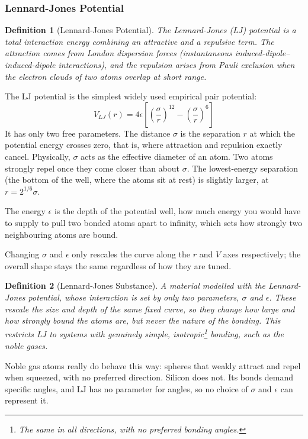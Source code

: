 \documentclass{article}
\newtheorem{definition}{Definition}
\begin{document}
\subsubsection{Lennard-Jones Potential}
\begin{definition}[Lennard-Jones Potential]
    The Lennard-Jones (LJ) potential is a total interaction energy combining an attractive and a repulsive term. The attraction comes from London dispersion forces (instantaneous induced-dipole--induced-dipole interactions), and the repulsion arises from Pauli exclusion when the electron clouds of two atoms overlap at short range.
\end{definition}
The LJ potential is the simplest widely used empirical pair potential:
\begin{equation}
    V_{LJ}(r) = 4\epsilon \left[ \left( \frac{\sigma}{r} \right)^{12} - \left( \frac{\sigma}{r} \right)^{6} \right]
\end{equation}
It has only two free parameters. The distance $\sigma$ is the separation $r$ at which the potential energy crosses zero, that is, where attraction and repulsion exactly cancel. Physically, $\sigma$ acts as the effective diameter of an atom. Two atoms strongly repel once they come closer than about $\sigma$. The lowest-energy separation (the bottom of the well, where the atoms sit at rest) is slightly larger, at $r = 2^{1/6}\sigma$.

The energy $\epsilon$ is the depth of the potential well, how much energy you would have to supply to pull two bonded atoms apart to infinity, which sets how strongly two neighbouring atoms are bound.

Changing $\sigma$ and $\epsilon$ only rescales the curve along the $r$ and $V$ axes respectively; the overall shape stays the same regardless of how they are tuned.
\begin{definition}[Lennard-Jones Substance]
    \label{LJ Substance}
    A material modelled with the Lennard-Jones potential, whose interaction is set by only two parameters, $\sigma$ and $\epsilon$. These rescale the size and depth of the same fixed curve, so they change how large and how strongly bound the atoms are, but never the nature of the bonding. This restricts LJ to systems with genuinely simple, isotropic\footnote{The same in all directions, with no preferred bonding angles.} bonding, such as the noble gases.
\end{definition}
Noble gas atoms really do behave this way: spheres that weakly attract and repel when squeezed, with no preferred direction. Silicon does not. Its bonds demand specific angles, and LJ has no parameter for angles, so no choice of $\sigma$ and $\epsilon$ can represent it.
\end{document}
